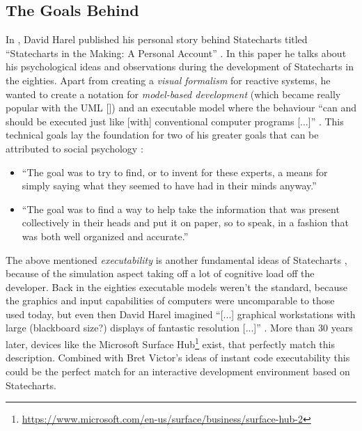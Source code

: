 \subsection{The Goals Behind}
\label{sub:goals-behind-statecharts}
In \citeyear{harel_statecharts_2007}, David Harel published his personal story behind Statecharts titled ``Statecharts in the Making: A Personal Account'' \autocite{harel_statecharts_2007}.
In this paper he talks about his psychological ideas and observations during the development of Statecharts in the eighties.
Apart from creating a \emph{visual formalism} for reactive systems, he wanted to create a notation for \emph{model-based development} (which became really popular with the UML [\textcite{cook_unified_2017}]) and an executable model where the behaviour ``can and should be executed just like [with] conventional computer programs [...]'' \autocite[1]{harel_statecharts_2007}.
This technical goals lay the foundation for two of his greater goals that can be attributed to social psychology \autocite[3--4]{harel_statecharts_2007}:
\begin{itemize}
    \item ``The goal was to try to find, or to invent for these experts, a means for simply saying what they seemed to have had in their minds anyway.''
    \item ``The goal was to find a way to help take the information that was present collectively in their heads and put it on paper, so to speak, in a fashion that was both well organized and accurate.''
\end{itemize}

The above mentioned \emph{executability} is another fundamental ideas of Statecharts \autocite[7]{harel_modeling_1998}, because of the simulation aspect taking off a lot of cognitive load off the developer.
Back in the eighties executable models weren't the standard, because the graphics and input capabilities of computers were uncomparable to those used today, but even then David Harel imagined ``[...] graphical workstations with large (blackboard size?) displays of fantastic resolution [...]'' \autocite[272]{harel_statecharts:_1987}.
More than 30 years later, devices like the Microsoft Surface Hub\footnote{\url{https://www.microsoft.com/en-us/surface/business/surface-hub-2}} exist, that perfectly match this description.
Combined with Bret Victor's ideas of instant code executability \autocite{victor_inventing_2012} this could be the perfect match for an interactive development environment based on Statecharts.


